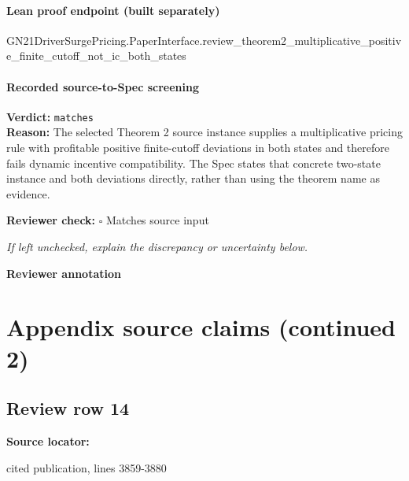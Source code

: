 \documentclass[10pt]{article}
\newcommand{\reviewerbox}{%
  \par\noindent\fbox{\parbox{0.96\linewidth}{\rule{0pt}{0.38in}}}\par
}
\newcommand{\reviewmatch}[1]{%
  \par\noindent\textbf{Reviewer check:} $\square$\; #1\par
  \noindent\emph{If left unchecked, explain the discrepancy or uncertainty below.}\par
}
\begin{document}
\paragraph{Lean proof endpoint (built separately)}\begin{ReviewVerbatim}
GN21DriverSurgePricing.PaperInterface.review_theorem2_multiplicative_positive_finite_cutoff_not_ic_both_states
\end{ReviewVerbatim}

\paragraph{Recorded source-to-Spec screening}
\textbf{Verdict:} \texttt{matches}
\\
\textbf{Reason:} The selected Theorem 2 source instance supplies a multiplicative pricing rule with profitable positive finite-cutoff deviations in both states and therefore fails dynamic incentive compatibility. The Spec states that concrete two-state instance and both deviations directly, rather than using the theorem name as evidence.
\reviewmatch{Matches source input}
\noindent\textbf{Reviewer annotation}\par
\reviewerbox
\clearpage
\hypertarget{source-claim-d0eae55048459432}{}
\hypertarget{source-section-e0bf42a2f186588f}{}
\section*{Appendix source claims (continued 2)}
\subsection*{Review row 14}
\textbf{Source locator:} {\footnotesize\raggedright cited publication, lines 3859-\allowbreak{}3880\par}
\end{document}

